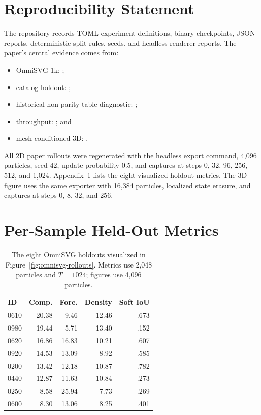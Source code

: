 \documentclass[sigconf,nonacm]{acmart}
\begin{document}
\section*{Reproducibility Statement}

The repository records TOML experiment definitions, binary checkpoints, JSON
reports, deterministic split rules, seeds, and headless renderer reports. The
paper's central evidence comes from:
\begin{itemize}
  \item OmniSVG-1k: ;
  \item catalog holdout: ;
  \item historical non-parity table diagnostic: ;
  \item throughput: ; and
  \item mesh-conditioned 3D:
  .
\end{itemize}
All 2D paper rollouts were regenerated with the headless export command, 4,096
particles, seed 42, update probability 0.5, and captures
at steps 0, 32, 96, 256, 512, and 1,024. Appendix~\ref{app:metrics} lists the
eight visualized holdout metrics. The 3D figure uses the same exporter with
16,384 particles, localized state erasure, and captures at steps 0, 8, 32,
and 256.

\appendix

\section{Per-Sample Held-Out Metrics}
\label{app:metrics}

\begin{table}[t]
\caption{The eight OmniSVG holdouts visualized in
Figure~\ref{fig:omnisvg-rollouts}. Metrics use 2,048
particles and $T=1024$; figures use 4,096 particles.}
\label{tab:per-sample}
\centering
\scriptsize
\begin{tabular}{lrrrr}
\toprule
ID & Comp. & Fore. & Density & Soft IoU \\
\midrule
0610 & 20.38 & 9.46 & 12.46 & .673 \\
0980 & 19.44 & 5.71 & 13.40 & .152 \\
0620 & 16.86 & 16.83 & 10.21 & .607 \\
0920 & 14.53 & 13.09 & 8.92 & .585 \\
0200 & 13.42 & 12.18 & 10.87 & .782 \\
0440 & 12.87 & 11.63 & 10.84 & .273 \\
0250 & 8.58 & 25.94 & 7.73 & .269 \\
0600 & 8.30 & 13.06 & 8.25 & .401 \\
\bottomrule
\end{tabular}
\end{table}
\end{document}
